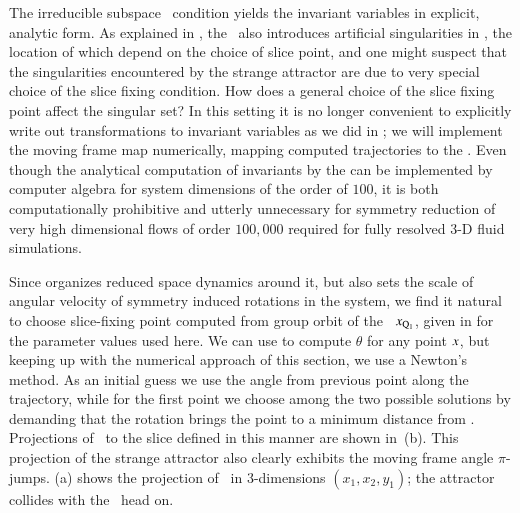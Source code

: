 \documentclass[final,number,sort&compress]{elsarticle}
\begin{document}
The irreducible subspace \slice\ condition
 yields the in\-vari\-ant variables
 in explicit, analytic form. As explained
in , the \mframes\ also introduces
artificial singularities in \reducedsp, the location of which
depend on the choice of slice point, and one might suspect that
the singularities encountered by the strange attractor are
due to very special choice of the slice fixing condition. How
does a general choice of the slice fixing point affect the singular
set? In this setting it is no longer convenient to explicitly write
out transformations to in\-vari\-ant variables as we did in
; we will implement the moving frame map
numerically, mapping computed trajectories to the \slice.
Even though the analytical computation of
in\-vari\-ants by the {\mframes} can be implemented by computer
algebra for system dimensions of the order
of $100$, it is both computationally prohibitive and utterly
unnecessary for symmetry reduction of very high dimensional
flows of order $100,000$ required for fully resolved $3$-D
fluid simulations.

Since  organizes reduced space dynamics around it,
but also sets the scale of angular velocity of symmetry
induced rotations in the system, we find it natural to choose
slice-fixing point  computed from
group orbit of the \reqv\ $x_{\mathrm{Q}_{1}}$, given in  for
the parameter values used here.
We can use
 to compute $\theta$ for any point $x$, but
keeping up with the numerical approach of this section, we
use a Newton's method. As an initial guess we use the angle
from previous point along the trajectory, while for the first
point we choose among the two possible solutions by demanding
that the rotation brings the point to a minimum distance from
\slicep. Projections of \cLf\ to the slice defined in this
manner are shown in \,(b). This projection
of the strange attractor also
clearly exhibits the moving frame angle $\pi$-jumps.
(a) shows the projection of \sset\ in
$3$-dimensions $(x_1,x_2,y_1)$; the attractor
collides with the \sset\ head on.
\end{document}
